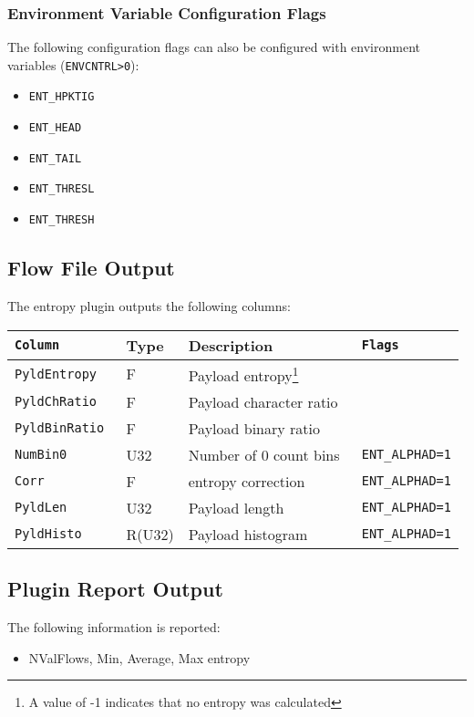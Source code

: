 \documentclass[documentation]{subfiles}
\begin{document}
\subsubsection{Environment Variable Configuration Flags}
The following configuration flags can also be configured with environment variables ({\tt ENVCNTRL>0}):
\begin{itemize}
    \item {\tt ENT\_HPKTIG}
    \item {\tt ENT\_HEAD}
    \item {\tt ENT\_TAIL}
    \item {\tt ENT\_THRESL}
    \item {\tt ENT\_THRESH}
\end{itemize}

\subsection{Flow File Output}
The entropy plugin outputs the following columns:
\begin{longtable}{>{\tt}lll>{\tt\small}l}
    \toprule
    {\bf Column} & {\bf Type} & {\bf Description} & {\bf Flags}\\
    \midrule\endhead%
    PyldEntropy  &      F & Payload entropy\footnote{A value of -1 indicates that no entropy was calculated} & \\
    PyldChRatio  &      F & Payload character ratio                                                          & \\
    PyldBinRatio &      F & Payload binary ratio                                                             & \\
    NumBin0      &    U32 & Number of 0 count bins                                                           & ENT\_ALPHAD=1\\
    Corr         &      F & entropy correction                                                               & ENT\_ALPHAD=1\\
    PyldLen      &    U32 & Payload length                                                                   & ENT\_ALPHAD=1\\
    PyldHisto    & R(U32) & Payload histogram                                                                & ENT\_ALPHAD=1\\
    \bottomrule
\end{longtable}

\subsection{Plugin Report Output}
The following information is reported:
\begin{itemize}
    \item NValFlows, Min, Average, Max entropy
\end{itemize}
\end{document}
